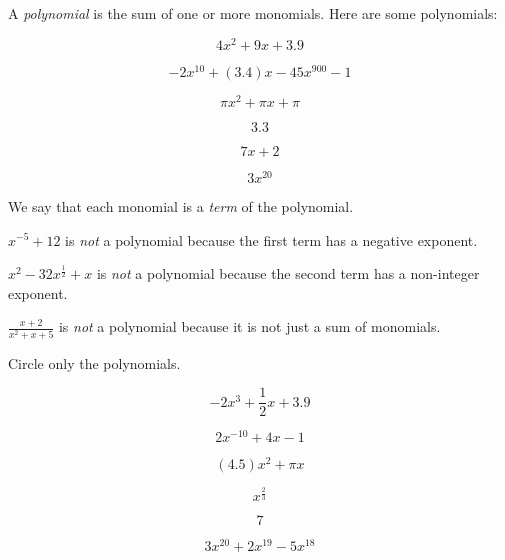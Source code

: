 A \emph{polynomial}  is the sum of one or more monomials.  Here are some polynomials:
\begin{multicols}{3}
  \begin{equation*}
    4 x^2 + 9x + 3.9
  \end{equation*}

  \begin{equation*}
    -2 x^{10} + (3.4)x - 45x^{900} - 1
  \end{equation*}

  \begin{equation*}
    \pi x^2 + \pi x + \pi
  \end{equation*}

  \begin{equation*}
    3.3
  \end{equation*}

  \begin{equation*}
   7x + 2
  \end{equation*}

  \begin{equation*}
    3x^{20}
  \end{equation*}
\end{multicols}
We say that each monomial is a \emph{term} of the polynomial.

$x^{-5} + 12$ is \emph{not} a polynomial because the first term has a negative exponent.

$x^{2} - 32x^{\frac{1}{2}} + x$ is \emph{not} a polynomial because the second term has a non-integer exponent.

$\frac{x + 2}{x^2 + x + 5}$ is \emph{not} a polynomial because it is not just a sum of monomials.

\begin{Exercise}[title={Identifying Polynomials}, label=findpolynomials]
    Circle only the polynomials.
\begin{multicols}{3}
  \begin{equation*}
    -2 x^3 + \frac{1}{2}x + 3.9
  \end{equation*}

  \begin{equation*}
    2 x^{-10} + 4x - 1
  \end{equation*}
  
  \begin{equation*}
    (4.5)x^2 + \pi x
  \end{equation*}
  
  \begin{equation*}
    x^{\frac{2}{3}}
  \end{equation*}
  
  \begin{equation*}
   7
  \end{equation*}

  \begin{equation*}
    3x^{20} + 2x^{19} -5 x^{18}
  \end{equation*}
\end{multicols}
\end{Exercise}

